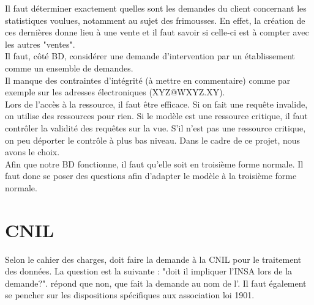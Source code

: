 \documentclass [a4paper] {article}
\begin{document}
Il faut déterminer exactement quelles sont les demandes du client concernant les statistiques voulues, notamment au sujet des frimousses. En effet, la création de ces dernières donne lieu à une vente et il faut savoir si celle-ci est à compter avec les autres "ventes".\\
Il faut, côté BD, considérer une demande d'intervention par un établissement comme un ensemble de demandes.\\
Il manque des contraintes d'intégrité (à mettre en commentaire) comme par exemple sur les adresses électroniques (XYZ@WXYZ.XY).\\
Lors de l'accès à la ressource, il faut être efficace. Si on fait une requête invalide, on utilise des ressources pour rien. Si le modèle est une ressource critique, il faut contrôler la validité des requêtes sur la vue. S'il n'est pas une ressource critique, on peu déporter le contrôle à plus bas niveau. Dans le cadre de ce projet, nous avons le choix.\\
Afin que notre BD fonctionne, il faut qu'elle soit en troisième forme normale. Il faut donc se poser des questions afin d'adapter le modèle à la troisième forme normale.

\section{CNIL}
Selon le cahier des charges, \Sergi{} doit faire la demande à la CNIL pour le traitement des données. La question est la suivante : "doit il impliquer l'INSA lors de la demande?". \nomTuteurPedago{} répond que non, que \Sergi{} fait la demande au nom de l'\nomClient{}. Il faut également se pencher sur les dispositions spécifiques aux association loi 1901.


\newpage
\end{document}
